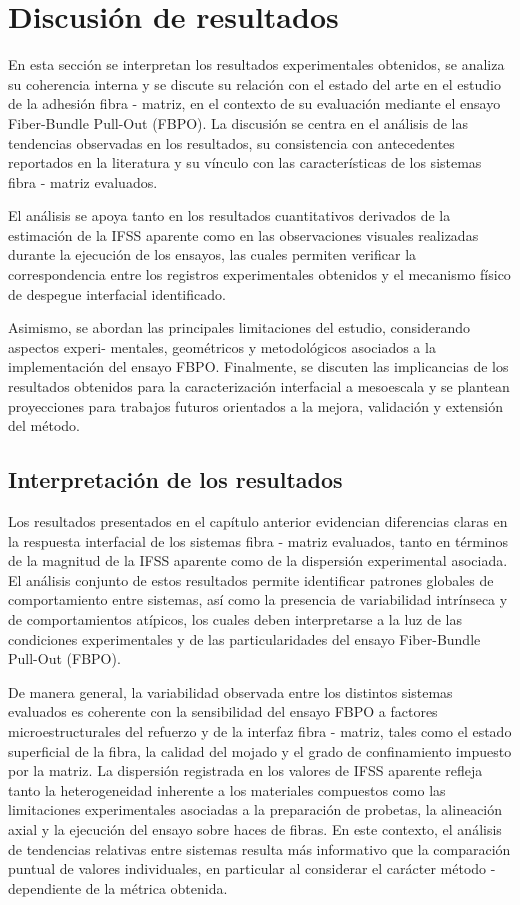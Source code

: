 \section{Discusión de resultados}

En esta sección se interpretan los resultados experimentales obtenidos, se analiza su coherencia
interna y se discute su relación con el estado del arte en el estudio de la adhesión fibra - matriz,
en el contexto de su evaluación mediante el ensayo Fiber-Bundle Pull-Out (FBPO). La discusión se
centra en el análisis de las tendencias observadas en los resultados, su consistencia con
antecedentes reportados en la literatura y su vínculo con las características de los sistemas
fibra - matriz evaluados.

El análisis se apoya tanto en los resultados cuantitativos derivados de la estimación de la IFSS
aparente como en las observaciones visuales realizadas durante la ejecución de los ensayos,
las cuales permiten verificar la correspondencia entre los registros experimentales obtenidos y
el mecanismo físico de despegue interfacial identificado.

Asimismo, se abordan las principales limitaciones del estudio, considerando aspectos
experi- mentales, geométricos y metodológicos asociados a la implementación del ensayo FBPO.
Finalmente, se discuten las implicancias de los resultados obtenidos para la caracterización
interfacial a mesoescala y se plantean proyecciones para trabajos futuros orientados a la mejora,
validación y extensión del método.

\subsection{Interpretación de los resultados}

Los resultados presentados en el capítulo anterior evidencian diferencias claras en la respuesta
interfacial de los sistemas fibra - matriz evaluados, tanto en términos de la magnitud de la IFSS
aparente como de la dispersión experimental asociada. El análisis conjunto de estos resultados
permite identificar patrones globales de comportamiento entre sistemas, así como la presencia
de variabilidad intrínseca y de comportamientos atípicos, los cuales deben interpretarse a la
luz de las condiciones experimentales y de las particularidades del ensayo Fiber-Bundle Pull-Out
(FBPO).

De manera general, la variabilidad observada entre los distintos sistemas evaluados es coherente
con la sensibilidad del ensayo FBPO a factores microestructurales del refuerzo y de la interfaz
fibra - matriz, tales como el estado superficial de la fibra, la calidad del mojado y el grado de
confinamiento impuesto por la matriz. La dispersión registrada en los valores de IFSS aparente
refleja tanto la heterogeneidad inherente a los materiales compuestos como las limitaciones
experimentales asociadas a la preparación de probetas, la alineación axial y la ejecución del
ensayo sobre haces de fibras. En este contexto, el análisis de tendencias relativas entre
sistemas resulta más informativo que la comparación puntual de valores individuales, en
particular al considerar el carácter método - dependiente de la métrica obtenida.


